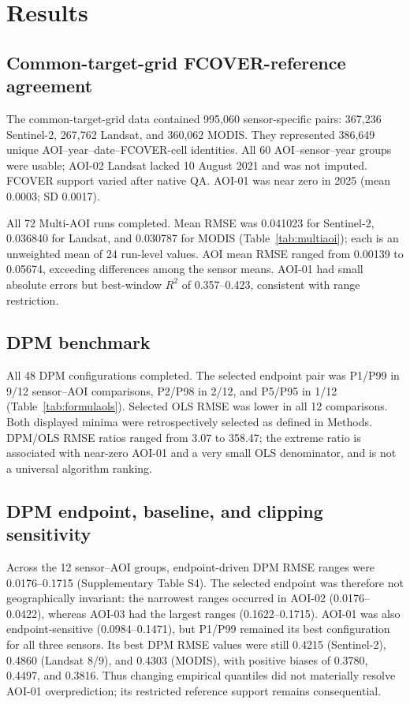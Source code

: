 \section{Results}
\subsection{Common-target-grid FCOVER-reference agreement}
The common-target-grid data contained 995,060 sensor-specific pairs: 367,236 Sentinel-2, 267,762 Landsat, and 360,062 MODIS. They represented 386,649 unique AOI--year--date--FCOVER-cell identities. All 60 AOI--sensor--year groups were usable; AOI-02 Landsat lacked 10 August 2021 and was not imputed. FCOVER support varied after native QA. AOI-01 was near zero in 2025 (mean 0.0003; SD 0.0017).

All 72 Multi-AOI runs completed. Mean RMSE was 0.041023 for Sentinel-2, 0.036840 for Landsat, and 0.030787 for MODIS (Table~\ref{tab:multiaoi}); each is an unweighted mean of 24 run-level values. AOI mean RMSE ranged from 0.00139 to 0.05674, exceeding differences among the sensor means. AOI-01 had small absolute errors but best-window $R^2$ of 0.357--0.423, consistent with range restriction.



\subsection{DPM benchmark}
All 48 DPM configurations completed. The selected endpoint pair was P1/P99 in 9/12 sensor--AOI comparisons, P2/P98 in 2/12, and P5/P95 in 1/12 (Table~\ref{tab:formulaols}). Selected OLS RMSE was lower in all 12 comparisons. Both displayed minima were retrospectively selected as defined in Methods. DPM/OLS RMSE ratios ranged from 3.07 to 358.47; the extreme ratio is associated with near-zero AOI-01 and a very small OLS denominator, and is not a universal algorithm ranking.



\subsection{DPM endpoint, baseline, and clipping sensitivity}
Across the 12 sensor--AOI groups, endpoint-driven DPM RMSE ranges were 0.0176--0.1715 (Supplementary Table S4). The selected endpoint was therefore not geographically invariant: the narrowest ranges occurred in AOI-02 (0.0176--0.0422), whereas AOI-03 had the largest ranges (0.1622--0.1715). AOI-01 was also endpoint-sensitive (0.0984--0.1471), but P1/P99 remained its best configuration for all three sensors. Its best DPM RMSE values were still 0.4215 (Sentinel-2), 0.4860 (Landsat 8/9), and 0.4303 (MODIS), with positive biases of 0.3780, 0.4497, and 0.3816. Thus changing empirical quantiles did not materially resolve AOI-01 overprediction; its restricted reference support remains consequential.

